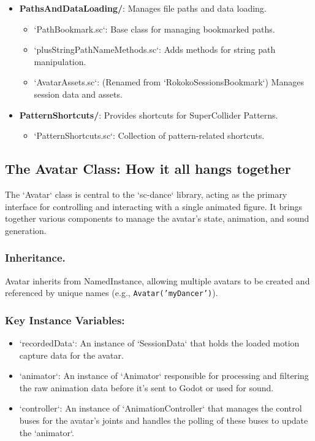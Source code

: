 \documentclass[11pt]{article}
\begin{document}
\begin{itemize}
\item \textbf{PathsAndDataLoading/}: Manages file paths and data loading.
\begin{itemize}
\item `PathBookmark.sc`: Base class for managing bookmarked paths.
\item `plusStringPathNameMethods.sc`: Adds methods for string path manipulation.
\item `AvatarAssets.sc`: (Renamed from `RokokoSessionsBookmark`) Manages session data and assets.
\end{itemize}

\item \textbf{PatternShortcuts/}: Provides shortcuts for SuperCollider Patterns.
\begin{itemize}
\item `PatternShortcuts.sc`: Collection of pattern-related shortcuts.
\end{itemize}
\end{itemize}
\subsection{The Avatar Class: How it all hangs together}
\label{sec:org7c84ea3}

The `Avatar` class is central to the `sc-dance` library, acting as the primary interface for controlling and interacting with a single animated figure. It brings together various components to manage the avatar's state, animation, and sound generation.
\subsubsection{Inheritance.}
\label{sec:org8889fd5}

Avatar inherits from NamedInstance, allowing multiple avatars to be created and referenced by unique names (e.g., \texttt{Avatar('myDancer')}).
\subsubsection{\textbf{Key Instance Variables}:}
\label{sec:org2fed298}
\begin{itemize}
\item `recordedData`: An instance of `SessionData` that holds the loaded motion capture data for the avatar.
\item `animator`: An instance of `Animator` responsible for processing and filtering the raw animation data before it's sent to Godot or used for sound.
\item `controller`: An instance of `AnimationController` that manages the control buses for the avatar's joints and handles the polling of these buses to update the `animator`.
\end{itemize}
\end{document}
